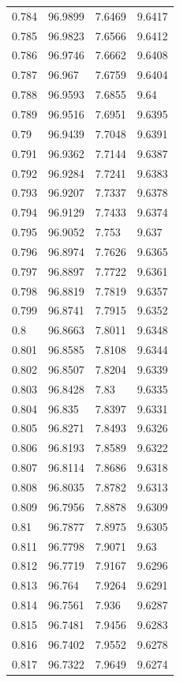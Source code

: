 \begin{tabular}{llll}
0.784 & 96.9899 & 7.6469 & 9.6417 \\
0.785 & 96.9823 & 7.6566 & 9.6412 \\
0.786 & 96.9746 & 7.6662 & 9.6408 \\
0.787 & 96.967 & 7.6759 & 9.6404 \\
0.788 & 96.9593 & 7.6855 & 9.64 \\
0.789 & 96.9516 & 7.6951 & 9.6395 \\
0.79 & 96.9439 & 7.7048 & 9.6391 \\
0.791 & 96.9362 & 7.7144 & 9.6387 \\
0.792 & 96.9284 & 7.7241 & 9.6383 \\
0.793 & 96.9207 & 7.7337 & 9.6378 \\
0.794 & 96.9129 & 7.7433 & 9.6374 \\
0.795 & 96.9052 & 7.753 & 9.637 \\
0.796 & 96.8974 & 7.7626 & 9.6365 \\
0.797 & 96.8897 & 7.7722 & 9.6361 \\
0.798 & 96.8819 & 7.7819 & 9.6357 \\
0.799 & 96.8741 & 7.7915 & 9.6352 \\
0.8 & 96.8663 & 7.8011 & 9.6348 \\
0.801 & 96.8585 & 7.8108 & 9.6344 \\
0.802 & 96.8507 & 7.8204 & 9.6339 \\
0.803 & 96.8428 & 7.83 & 9.6335 \\
0.804 & 96.835 & 7.8397 & 9.6331 \\
0.805 & 96.8271 & 7.8493 & 9.6326 \\
0.806 & 96.8193 & 7.8589 & 9.6322 \\
0.807 & 96.8114 & 7.8686 & 9.6318 \\
0.808 & 96.8035 & 7.8782 & 9.6313 \\
0.809 & 96.7956 & 7.8878 & 9.6309 \\
0.81 & 96.7877 & 7.8975 & 9.6305 \\
0.811 & 96.7798 & 7.9071 & 9.63 \\
0.812 & 96.7719 & 7.9167 & 9.6296 \\
0.813 & 96.764 & 7.9264 & 9.6291 \\
0.814 & 96.7561 & 7.936 & 9.6287 \\
0.815 & 96.7481 & 7.9456 & 9.6283 \\
0.816 & 96.7402 & 7.9552 & 9.6278 \\
0.817 & 96.7322 & 7.9649 & 9.6274 \\

\end{tabular}
